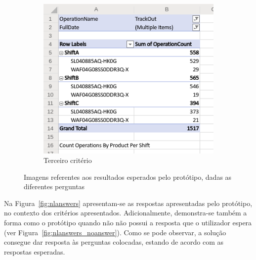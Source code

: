 \begin{figure}
\begin{subfigure}{.55\textwidth}
        \includegraphics[width=\textwidth]{ch06/assets/expected03.png}
        \caption{Terceiro critério}
     \end{subfigure}
\caption{Imagens referentes aos resultados esperados pelo protótipo, dadas as diferentes perguntas}
\label{fig:nlexpectedanswers}
\end{figure}

Na Figura~\ref{fig:nlanswers} apresentam-se as respostas apresentadas pelo protótipo, no contexto dos critérios apresentados. Adicionalmente, demonstra-se também a forma como o protótipo  quando não não possui a resposta que o utilizador espera (ver Figura~\ref{fig:nlanswers_noanswer}). Como se pode observar, a solução consegue dar resposta às perguntas colocadas, estando de acordo com as respostas esperadas.

